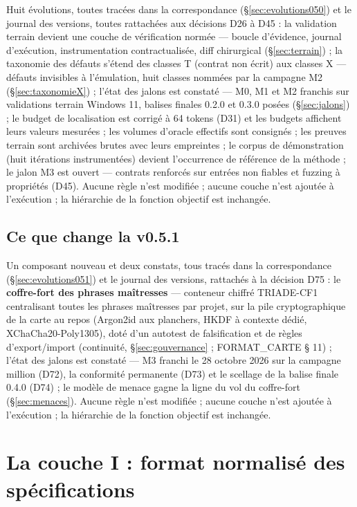 Huit évolutions, toutes tracées dans la correspondance (§\ref{sec:evolutions050}) et le
journal des versions, toutes rattachées aux décisions D26 à D45 : la validation
terrain devient une couche de vérification normée — boucle d’évidence, journal
d’exécution, instrumentation contractualisée, diff chirurgical (§\ref{sec:terrain}) ;
la taxonomie des défauts s’étend des classes T (contrat non écrit) aux classes X —
défauts invisibles à l’émulation, huit classes nommées par la campagne M2
(§\ref{sec:taxonomieX}) ; l’état des jalons est constaté — M0, M1 et M2 franchis sur
validations terrain Windows 11, balises finales 0.2.0 et 0.3.0 posées
(§\ref{sec:jalons}) ; le budget de localisation est corrigé à 64 tokens (D31) et les
budgets affichent leurs valeurs mesurées ; les volumes d’oracle effectifs sont
consignés ; les preuves terrain sont archivées brutes avec leurs empreintes ; le
corpus de démonstration (huit itérations instrumentées) devient l’occurrence de
référence de la méthode ; le jalon M3 est ouvert — contrats renforcés sur entrées non
fiables et fuzzing à propriétés (D45). Aucune règle n’est modifiée ; aucune couche
n’est ajoutée à l’exécution ; la hiérarchie de la fonction objectif est inchangée.

\subsection{Ce que change la v0.5.1}\label{sec:nouveautes051}

Un composant nouveau et deux constats, tous tracés dans la correspondance
(§\ref{sec:evolutions051}) et le journal des versions, rattachés à la décision D75 : le
\textbf{coffre-fort des phrases maîtresses} — conteneur chiffré TRIADE-CF1 centralisant
toutes les phrases maîtresses par projet, sur la pile cryptographique de la carte au
repos (Argon2id aux planchers, HKDF à contexte dédié, XChaCha20-Poly1305), doté d’un
autotest de falsification et de règles d’export/import (continuité,
§\ref{sec:gouvernance} ; FORMAT\_CARTE § 11) ; l’état des jalons est constaté — M3
franchi le 28 octobre 2026 sur la campagne million (D72), la conformité permanente
(D73) et le scellage de la balise finale 0.4.0 (D74) ; le modèle de menace gagne la
ligne du vol du coffre-fort (§\ref{sec:menaces}). Aucune règle n’est modifiée ; aucune
couche n’est ajoutée à l’exécution ; la hiérarchie de la fonction objectif est inchangée.

\section{La couche I : format normalisé des spécifications}\label{sec:coucheI}

